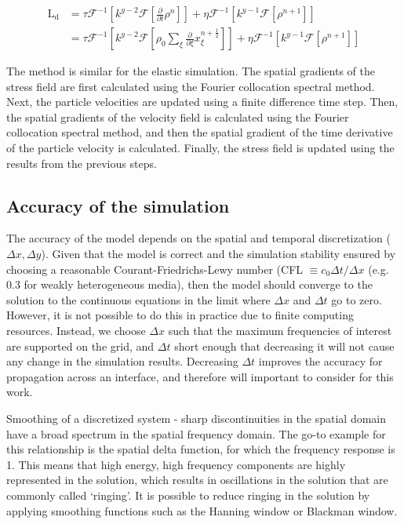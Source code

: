 \documentclass[10pt,a4paper]{article}
\begin{document}
\begin{align}
\text{L}_{\text{d}} &= \tau \mathcal{F}^{-1} \left[k^{y-2} \mathcal{F} \left[\frac{\partial}{\partial t} \rho^n \right] \right] + \eta \mathcal{F}^{-1} \left[ k^{y-1} \mathcal{F}\left[\rho^{n+1}\right] \right]\\
&= \tau \mathcal{F}^{-1} \left[k^{y-2} \mathcal{F} \left[\rho_0 \sum_{\xi} \frac{\partial}{\partial \xi} x_{\xi}^{n+\frac{1}{2}} \right] \right] + \eta \mathcal{F}^{-1} \left[ k^{y-1} \mathcal{F}\left[\rho^{n+1}\right] \right]
\end{align}

The method is similar for the elastic simulation. The spatial gradients of the stress field are first calculated using the Fourier collocation spectral method. Next, the particle velocities are updated using a finite difference time step. Then, the spatial gradients of the velocity field is calculated using the Fourier collocation spectral method, and then the spatial gradient of the time derivative of the particle velocity is calculated. Finally, the stress field is updated using the results from the previous steps. 

\subsection*{Accuracy of the simulation}

The accuracy of the model depends on the spatial and temporal discretization ($\Delta x, \Delta y$). Given that the model is correct and the simulation stability ensured by choosing a reasonable Courant-Friedrichs-Lewy number (CFL $\equiv c_0 \Delta t /\Delta x$ (e.g. 0.3 for weakly heterogeneous media), then the model should converge to the solution to the continuous equations in the limit where $\Delta x$ and $\Delta t$ go to zero. However, it is not possible to do this in practice due to finite computing resources. Instead, we choose $\Delta x$ such that the maximum frequencies of interest are supported on the grid, and $\Delta t$ short enough that decreasing it will not cause any change in the simulation results. Decreasing $\Delta t$ improves the accuracy for propagation across an interface, and therefore will important to consider for this work. 

Smoothing of a discretized system - sharp discontinuities in the spatial domain have a broad spectrum in the spatial frequency domain. The go-to example for this relationship is the spatial delta function, for which the frequency response is 1. This means that high energy, high frequency components are highly represented in the solution, which results in oscillations in the solution that are commonly called `ringing'. It is possible to reduce ringing in the solution by applying smoothing functions such as the Hanning window or Blackman window. 
\end{document}
